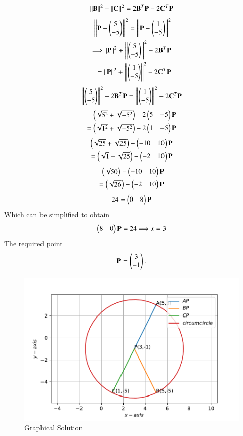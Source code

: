 \documentclass[journal,12pt,twocolumn]{IEEEtran}
\begin{document}
\begin{align}
    \left\lVert\mathbf{B}\right\rVert^2 - \left\lVert\mathbf{C}\right\rVert^2 =2\mathbf{B}^T\mathbf{P} -2\mathbf{C}^T\mathbf{P}
\end{align}
\begin{align}
    \left\lVert\mathbf{P}-\begin{pmatrix}5\\-5\end{pmatrix}\right\rVert^2 =\left\lVert\mathbf{P} - \begin{pmatrix}1\\-5\end{pmatrix}\right\rVert^2\\
    \Longrightarrow \left\lVert\mathbf{P}\right\rVert^2 + \left\lVert\begin{pmatrix}5\\-5\end{pmatrix}\right\rVert^2 -2\mathbf{B}^T\mathbf{P}\\ = \left\lVert\mathbf{P}\right\rVert^2 + \left\lVert\begin{pmatrix}1\\-5\end{pmatrix}\right\rVert^2 -2\mathbf{C}^T\mathbf{P}
\end{align}
\begin{align}
    \left\lVert\begin{pmatrix}5\\-5\end{pmatrix}\right\rVert^2 -2\mathbf{B}^T\mathbf{P} = \left\lVert\begin{pmatrix}1\\-5\end{pmatrix}\right\rVert^2 -2\mathbf{C}^T\mathbf{P}
\end{align}
\begin{align}
    \begin{pmatrix}\sqrt{5^2}+\sqrt{-5^2}\end{pmatrix} -2\begin{pmatrix}5&-5\end{pmatrix}\mathbf{P} \\= \begin{pmatrix}\sqrt{1^2}+\sqrt{-5^2}\end{pmatrix} -2\begin{pmatrix}1&-5\end{pmatrix}\mathbf{P}         
\end{align}
\begin{align}
    \begin{pmatrix}\sqrt{25}+\sqrt{25}\end{pmatrix} -\begin{pmatrix}-10&10\end{pmatrix}\mathbf{P} \\= \begin{pmatrix}\sqrt{1}+\sqrt{25}\end{pmatrix} -\begin{pmatrix}-2&10\end{pmatrix}\mathbf{P}
\end{align}
\begin{align}
    \begin{pmatrix}\sqrt{50}\end{pmatrix} -\begin{pmatrix}-10&10\end{pmatrix}\mathbf{P} \\= \begin{pmatrix}\sqrt{26}\end{pmatrix} -\begin{pmatrix}-2&10\end{pmatrix}\mathbf{P}
\end{align}
\begin{align}
    24 = \begin{pmatrix}0&8\end{pmatrix}\mathbf{P}
\end{align}
Which can be simplified to obtain
\begin{align}
    \begin{pmatrix}8&0\end{pmatrix}\mathbf{P} = 24
    \Longrightarrow x = 3
\end{align}
The required point 
\begin{align}
    \mathbf{P}=\begin{pmatrix}3\\-1\end{pmatrix}.
\end{align}
\begin{figure}
    \centering
    \includegraphics[width=\columnwidth]{equidistant point circumcircle.pdf}
    \caption{Graphical Solution}
    \label{fig:my_label}
\end{figure}\\
\end{document}
